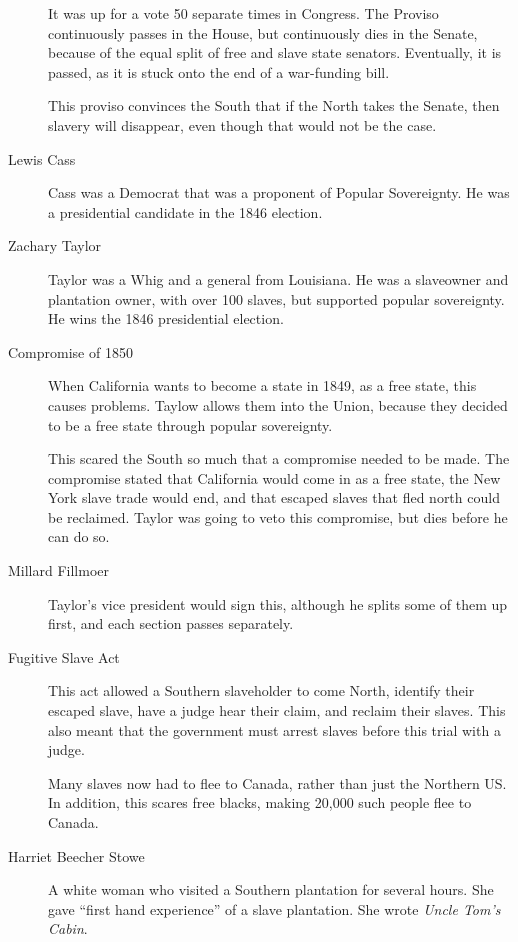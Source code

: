 \begin{description}
  It was up for a vote 50 separate times in Congress.
  The Proviso continuously passes in the House, but continuously dies in the Senate, because of the equal split of free and slave state senators.
  Eventually, it is passed, as it is stuck onto the end of a war-funding bill.

  This proviso convinces the South that if the North takes the Senate, then slavery will disappear, even though that would not be the case.

\item[Lewis Cass] Cass was a Democrat that was a proponent of Popular Sovereignty.
  He was a presidential candidate in the 1846 election.

\item[Zachary Taylor] Taylor was a Whig and a general from Louisiana.
  He was a slaveowner and plantation owner, with over 100 slaves, but supported popular sovereignty.
  He wins the 1846 presidential election.

\item[Compromise of 1850] When California wants to become a state in 1849, as a free state, this causes problems.
  Taylow allows them into the Union, because they decided to be a free state through popular sovereignty.

  This scared the South so much that a compromise needed to be made.
  The compromise stated that California would come in as a free state, the New York slave trade would end, and that escaped slaves that fled north could be reclaimed.
  Taylor was going to veto this compromise, but dies before he can do so.

\item[Millard Fillmoer] Taylor's vice president would sign this, although he splits some of them up first, and each section passes separately.

\item[Fugitive Slave Act] This act allowed a Southern slaveholder to come North, identify their escaped slave, have a judge hear their claim, and reclaim their slaves.
  This also meant that the government must arrest slaves before this trial with a judge.

  Many slaves now had to flee to Canada, rather than just the Northern US.\@
  In addition, this scares free blacks, making 20,000 such people flee to Canada.

\item[Harriet Beecher Stowe] A white woman who visited a Southern plantation for several hours.
  She gave ``first hand experience'' of a slave plantation.
  She wrote \textit{Uncle Tom's Cabin}.


\end{description}
